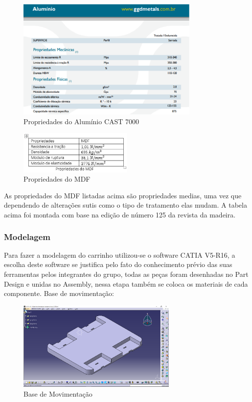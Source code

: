 \begin{figure}[H]
    \centering
    \includegraphics[width=0.8\textwidth]{figuras/pp_aluminio.eps}
    \caption{Propriedades do Alumínio CAST 7000}
    \label{fig:pp_aluminio}
\end{figure}


\begin{figure}[H]
    \centering
    \includegraphics[width=0.5\textwidth]{figuras/pp_MDF.eps}
    \caption{Propriedades do MDF}
    \label{fig:pp_MDF}
\end{figure}

As propriedades do MDF listadas acima são propriedades medias, uma vez que dependendo de alterações sutis como o tipo de
tratamento elas mudam. A tabela acima foi montada com base na edição de número 125 da revista da madeira.

\subsubsection{Modelagem}

Para fazer a modelagem do carrinho utilizou-se o software CATIA V5-R16, a escolha deste software se justifica pelo fato do
conhecimento prévio das suas ferramentas pelos integrantes do grupo, todas as peças foram desenhadas no Part Design e unidas
no Assembly, nessa etapa também se coloca os materiais de cada componente. Base de movimentação:

\begin{figure}[H]
    \centering
    \includegraphics[width=0.7\textwidth]{figuras/base.eps}
    \caption{Base de Movimentação}
    \label{fig:base}
\end{figure}


